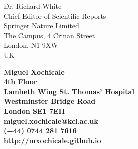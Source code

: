 \documentclass[10pt]{letter}
\begin{document}
\begin{letter}{Dr. Richard White \\
Chief Editor of Scientific Reports \\
Springer Nature Limited \\
The Campus, 4 Crinan Street\\
London, N1 9XW \\
UK
} 

\begin{flushright}
\large\bf Miguel Xochicale \\ %
4th Floor \\
Lambeth Wing  St. Thomas' Hospital \\
Westminster Bridge Road \\
London SE1 7EH \\
\faEnvelopeO  miguel.xochicale@kcl.ac.uk \\
\faMobile  (+44) 0744 281 7616 \\
\faHome \href{http://mxochicale.github.io}{http://mxochicale.github.io}
\end{flushright} 

\vspace{20pt}
\signature{Miguel Xochicale} %



\end{letter}
\end{document}
